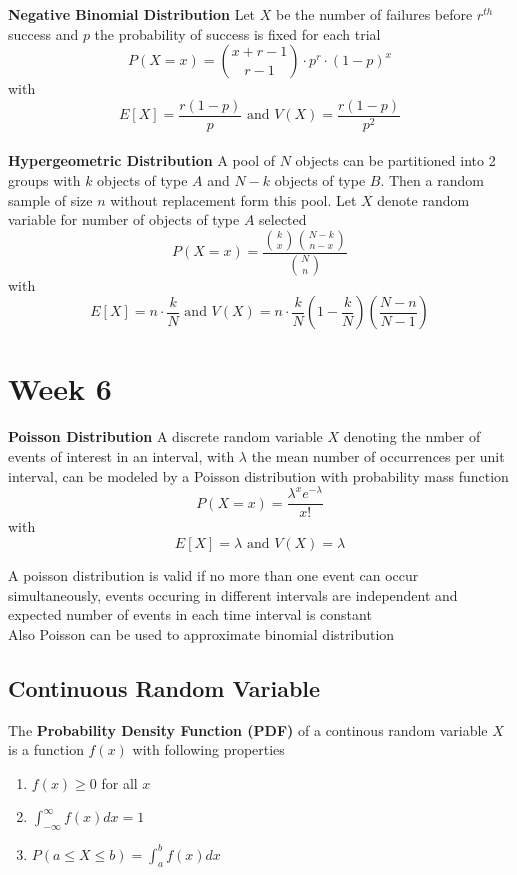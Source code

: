 \documentclass[11pt]{article}
\begin{document}
$ $\\
\textbf{Negative Binomial Distribution} Let $X$ be the number of failures before $r^{th}$ success and $p$ the probability of success is fixed for each trial
\[
  P(X=x) = \binom{x+r-1}{r-1}\cdot p^r \cdot (1-p)^x
\]
with
\[
  E[X] = \frac{r(1-p)}{p} \text{ and } V(X) = \frac{r(1-p)}{p^2}
\]
\\


$ $\\
\textbf{Hypergeometric Distribution} A pool of $N$ objects can be partitioned into 2 groups with $k$ objects of type $A$ and $N-k$ objects of type $B$. Then a random sample of size $n$ without replacement form this pool. Let $X$ denote random variable for number of objects of type $A$ selected
\[
  P(X=x) = \frac{\binom{k}{x} \binom{N-k}{n-x}}{\binom{N}{n}}
\]
with
\[
  E[X] = n\cdot \frac{k}{N} \text{ and } V(X) = n\cdot \frac{k}{N}(1- \frac{k}{N})(\frac{N-n}{N-1})
\]

\section*{Week 6}

\textbf{Poisson Distribution} A discrete random variable $X$ denoting the nmber of events of interest in an interval, with $\lambda$ the mean number of occurrences per unit interval, can be modeled by a Poisson distribution with probability mass function
\[
  P(X=x) = \frac{\lambda^x e^{-\lambda}}{x!}
\]
with
\[
  E[X] = \lambda \text{ and } V(X) = \lambda
\]
\begin{rem}
  A poisson distribution is valid if no more than one event can occur simultaneously, events occuring in different intervals are independent and expected number of events in each time interval is constant\\
  Also Poisson can be used to approximate binomial distribution
\end{rem}


\subsection*{Continuous Random Variable}

The \textbf{Probability Density Function (PDF)} of a continous random variable $X$ is a function $f(x)$ with following properties
\begin{enumerate}
  \item $f(x)\geq 0$ for all $x$
  \item $\int_{-\infty}^{\infty} f(x) dx = 1$
  \item $P(a\leq X \leq b) = \int_{a}^{b} f(x) dx$
\end{enumerate}
\end{document}
